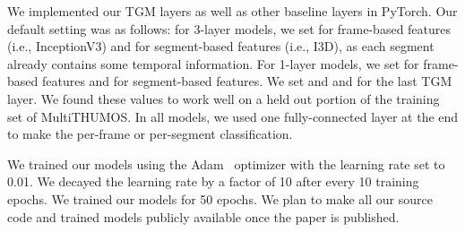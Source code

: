 \documentclass{article}
\begin{document}
We implemented our TGM layers as well as other baseline layers in PyTorch. Our default setting was as follows: for 3-layer models, we set  for frame-based features (i.e., InceptionV3) and  for segment-based features (i.e., I3D), as each segment already contains some temporal information. For 1-layer models, we set  for frame-based features and  for segment-based features. We set  and  and  for the last TGM layer. We found these values to work well on a held out portion of the training set of MultiTHUMOS. In all models, we used one fully-connected layer at the end to make the per-frame or per-segment classification.

We trained our models using the Adam~\citep{kingma2014adam} optimizer with the learning rate set to 0.01. We decayed the learning rate by a factor of 10 after every 10 training epochs. We trained our models for 50 epochs. We plan to make all our source code and trained models publicly available once the paper is published.
\end{document}
